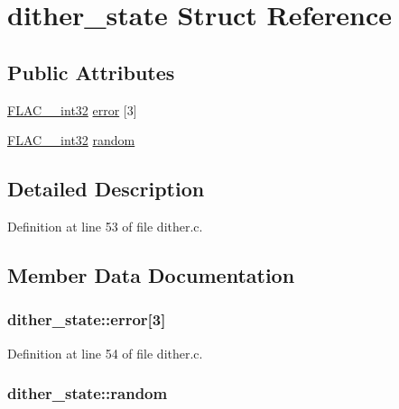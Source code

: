\hypertarget{structdither__state}{}\section{dither\+\_\+state Struct Reference}
\label{structdither__state}
\subsection*{Public Attributes}
\begin{DoxyCompactItemize}
\item 
\hyperlink{ordinals_8h_a33fd77bfe6d685541a0c034a75deccdc}{F\+L\+A\+C\+\_\+\+\_\+int32} \hyperlink{structdither__state_a29eabf9bd746ecf4acd354ed9f7a93d3}{error} \mbox{[}3\mbox{]}
\item 
\hyperlink{ordinals_8h_a33fd77bfe6d685541a0c034a75deccdc}{F\+L\+A\+C\+\_\+\+\_\+int32} \hyperlink{structdither__state_ab37a9d1d6de7640d2908d16eba48d3e7}{random}
\end{DoxyCompactItemize}


\subsection{Detailed Description}


Definition at line 53 of file dither.\+c.



\subsection{Member Data Documentation}
\subsubsection[{\texorpdfstring{error}{error}}]{ dither\+\_\+state\+::error\mbox{[}3\mbox{]}}\hypertarget{structdither__state_a29eabf9bd746ecf4acd354ed9f7a93d3}{}\label{structdither__state_a29eabf9bd746ecf4acd354ed9f7a93d3}


Definition at line 54 of file dither.\+c.

\subsubsection[{\texorpdfstring{random}{random}}]{ dither\+\_\+state\+::random}\hypertarget{structdither__state_ab37a9d1d6de7640d2908d16eba48d3e7}{}\label{structdither__state_ab37a9d1d6de7640d2908d16eba48d3e7}


